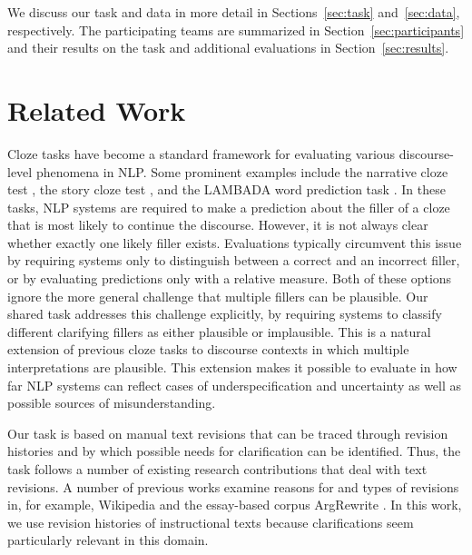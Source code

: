 \documentclass[11pt]{article}
\begin{document}
We discuss our task and data in more detail in Sections~\ref{sec:task} and~\ref{sec:data}, respectively. The participating teams are summarized in Section~\ref{sec:participants} and their results on the task and additional evaluations in Section~\ref{sec:results}.

\section{Related Work}
\label{sec:relwork}

Cloze tasks have become a standard framework for evaluating various discourse-level phenomena in NLP. Some prominent examples include the narrative cloze test \cite{chambers-jurafsky-2008-unsupervised}, the story cloze test \cite{mostafazadeh-etal-2016-corpus}, and the LAMBADA word prediction task \cite{paperno-etal-2016-lambada}. In these tasks, NLP systems are required to make a prediction about the filler of a cloze that is most likely to continue the discourse. 
However, it is not always clear whether exactly one likely filler exists. Evaluations typically circumvent this issue by requiring systems only to distinguish between a correct and an incorrect filler, or by evaluating predictions only with a relative measure. Both of these options ignore the more general challenge that multiple fillers can be plausible. 
Our shared task addresses this challenge explicitly, by requiring systems to classify different clarifying fillers as either plausible or implausible. This is a natural extension of previous cloze tasks to discourse contexts in which multiple interpretations are plausible. This extension makes it possible to evaluate in how far NLP systems can reflect cases of underspecification and uncertainty as well as possible sources of misunderstanding.

Our task is based on manual text revisions that can be traced through revision histories and by which possible needs for clarification can be identified. Thus, the task follows a number of existing research contributions that deal with text revisions. A number of previous works examine reasons for and types of revisions in, for example, Wikipedia \cite{bronner-monz-2012-user,daxenberger-gurevych-2012-corpus,yang-etal-2017-identifying-semantic,faruqui-etal-2018-wikiatomicedits} and the essay-based corpus ArgRewrite \cite{zhang-litman-2015-annotation,zhang-litman-2016-using,afrin:2019:identifying,kashefi:2022:argrewriteV2}. In this work, we use revision histories of instructional texts because clarifications seem particularly relevant in this domain.
\end{document}
